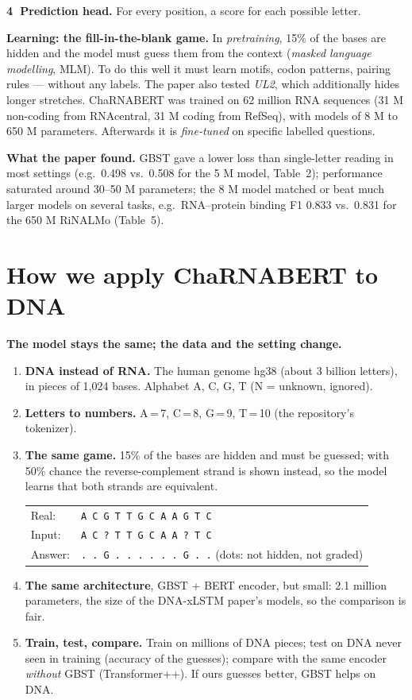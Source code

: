 \documentclass[11pt,a4paper]{article}
\newcommand{\code}[1]{\texttt{\small #1}}
\begin{document}
\textbf{\textcircled{4} Prediction head.} For every position, a score for each possible letter.

\textbf{Learning: the fill-in-the-blank game.} In \emph{pretraining}, 15\% of the bases are hidden
and the model must guess them from the context (\emph{masked language modelling}, MLM). To do this
well it must learn motifs, codon patterns, pairing rules --- without any labels. The paper also
tested \emph{UL2}, which additionally hides longer stretches. ChaRNABERT was trained on 62 million
RNA sequences (31 M non-coding from RNAcentral, 31 M coding from RefSeq), with models of 8 M to
650 M parameters. Afterwards it is \emph{fine-tuned} on specific labelled questions.

\textbf{What the paper found.} GBST gave a lower loss than single-letter reading in most settings
(e.g.\ 0.498 vs.\ 0.508 for the 5 M model, Table~2); performance saturated around 30--50 M
parameters; the 8 M model matched or beat much larger models on several tasks, e.g.\ RNA--protein
binding F1 0.833 vs.\ 0.831 for the 650 M RiNALMo (Table~5).

\section{How we apply ChaRNABERT to DNA}

\textbf{The model stays the same; the data and the setting change.}

\begin{enumerate}
\item \textbf{DNA instead of RNA.} The human genome hg38 (about 3 billion letters), in pieces of
  1,024 bases. Alphabet A, C, G, T (N = unknown, ignored).
\item \textbf{Letters to numbers.} A\,=\,7, C\,=\,8, G\,=\,9, T\,=\,10 (the repository's tokenizer).
\item \textbf{The same game.} 15\% of the bases are hidden and must be guessed; with 50\%
  chance the reverse-complement strand is shown instead, so the model learns that both strands
  are equivalent.
\begin{center}\small
\begin{tabular}{ll}
Real:   & \code{A C G T T G C A A G T C} \\
Input:  & \code{A C ? T T G C A A ? T C} \\
Answer: & \code{. . G . . . . . . G . .} \quad (dots: not hidden, not graded)
\end{tabular}
\end{center}
\item \textbf{The same architecture}, GBST + BERT encoder, but small: 2.1 million parameters, the
  size of the DNA-xLSTM paper's models, so the comparison is fair.
\item \textbf{Train, test, compare.} Train on millions of DNA pieces; test on DNA never seen in
  training (accuracy of the guesses); compare with the same encoder \emph{without} GBST
  (Transformer++). If ours guesses better, GBST helps on DNA.
\end{enumerate}
\end{document}
